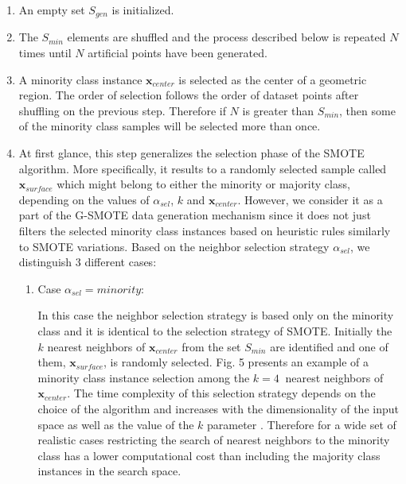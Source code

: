 \documentclass[parskip=full]{scrartcl}
\begin{document}
\begin{enumerate}
	
	\item An empty set \( S_{gen} \) is initialized. 

	\item The \( S_{min} \) elements are shuffled and the process described
	below is repeated \( N \) times until \( N \) artificial points have been
	generated.
	
	\item A minority class instance \( \textbf{x}_{center} \) is selected as the
	center of a geometric region. The order of selection follows the order of
	dataset points after shuffling on the previous step. Therefore if \( N \) is
	greater than \( S_{min} \), then some of the minority class samples will be
	selected more than once.

	\item At first glance, this step generalizes the selection phase of the
	SMOTE algorithm. More specifically, it results to a randomly selected sample
	called \( \textbf{x}_{surface} \) which might belong to either the minority
	or majority class, depending on the values of \( \alpha_{sel} \), \(k\) and
	\( \textbf{x}_{center} \). However, we consider it as a part of the G-SMOTE
	data generation mechanism since it does not just filters the selected
	minority class instances based on heuristic rules similarly to SMOTE
	variations. Based on the neighbor selection strategy \( \alpha_{sel} \), we
	distinguish 3 different cases:
	
	\begin{enumerate}

	\item Case \( \alpha_{sel} = minority \):

	In this case the neighbor selection strategy is based only on the minority
	class and it is identical to the selection strategy of SMOTE. Initially the
	\( k \) nearest neighbors of \( \textbf{x}_{center} \) from the set
	\(S_{min} \) are identified and one of them, \( \textbf{x}_{surface} \), is
	randomly selected. Fig. 5 presents an example of a minority class instance
	selection among the \( k = 4 \ \) nearest neighbors of \(\textbf{x}_{center}
	\). The time complexity of this selection strategy depends on the choice of
	the algorithm and increases with the dimensionality of the input space as
	well as the value of the \( k \) parameter \cite{Vaidya1989}. Therefore for
	a wide set of realistic cases restricting the search of nearest neighbors to
	the minority class has a lower computational cost than including the
	majority class instances in the search space.


\end{enumerate}
\end{enumerate}
\end{document}
